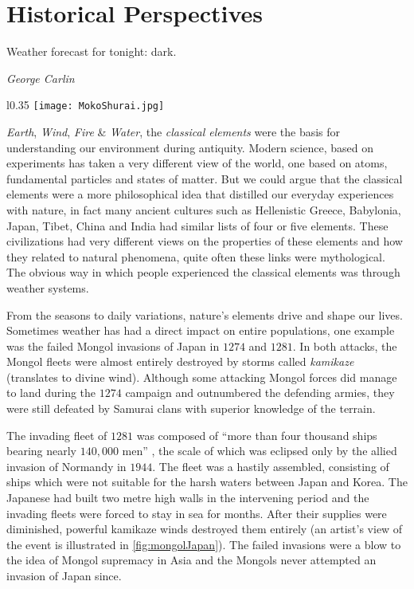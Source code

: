 \chapter{Historical Perspectives}\label{chapter:introduction}

\epigraph{Weather forecast for tonight: dark.}{\textit{George Carlin}}

\begin{wrapfigure}{l}{0.35\textwidth}
    \centering\texttt{[image: MokoShurai.jpg]}
    \caption{\small The Mongol fleet destroyed in a typhoon, 1847. 
    \textit{Source}: Kikuchi Y\={o}sai / Tokyo National Museum (Public domain)}
    \label{fig:mongolJapan}
\end{wrapfigure}

\emph{Earth}, \emph{Wind}, \emph{Fire} \& \emph{Water}, the \emph{classical elements} were the 
basis for understanding our environment during antiquity. Modern science, based on experiments has 
taken a very different view of the world, one based on atoms, fundamental particles and states of 
matter. But we could argue that the classical elements were a more philosophical idea that 
distilled our everyday experiences with nature, in fact many ancient cultures such as 
Hellenistic Greece, Babylonia, Japan, Tibet, China and India had similar lists of four or five 
elements. These civilizations had very different views on the properties of these elements and how 
they related to natural phenomena, quite often these links were mythological. The obvious way in 
which people experienced the classical elements was through weather systems. 

From the seasons to daily variations, nature's elements drive and shape our lives. Sometimes 
weather has had a direct impact on entire populations, one example was the failed Mongol invasions 
of Japan in $1274$ and $1281$. In both attacks, the Mongol fleets were almost entirely destroyed by 
storms called \emph{kamikaze} (translates to divine wind). Although some attacking Mongol forces 
did manage to land during the $1274$ campaign and outnumbered the defending armies, they were still 
defeated by Samurai clans with superior knowledge of the terrain. 

The invading fleet of $1281$ was composed of \enquote{more than four thousand ships bearing nearly 
$140,000$ men} \citep[pg.~17]{mcclain2002japan}, the scale of which was eclipsed only by the allied 
invasion of Normandy in $1944$. The fleet was a hastily assembled, consisting of ships which were 
not suitable for the harsh waters between Japan and Korea. The Japanese had built two metre high 
walls in the intervening period and the invading fleets were forced to stay in sea for months. 
After their supplies were diminished, powerful kamikaze winds destroyed them entirely (an artist's 
view of the event is illustrated in \cref{fig:mongolJapan}). The failed invasions were a blow to 
the idea of Mongol supremacy in Asia and the Mongols never attempted an invasion of Japan since.

